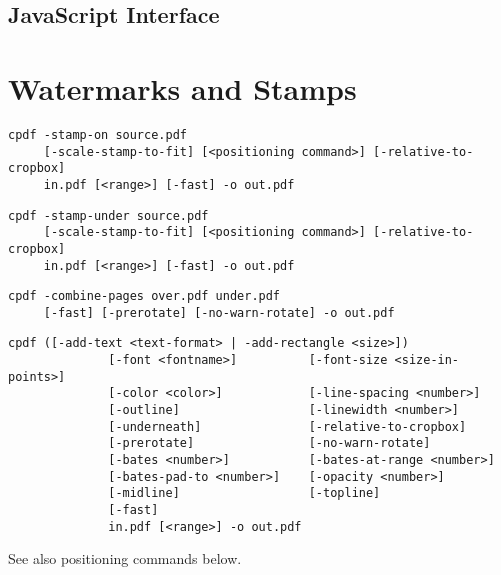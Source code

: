 \documentclass{book}
\begin{document}
\begin{jscpdflib}
\clearpage
\section*{JavaScript Interface}
\begin{small}\tt

\end{small}
\end{jscpdflib}

\chapter{Watermarks and Stamps}\label{chap:8}
\label{stamps}
  \begin{framed}
  \noindent\small\verb!cpdf -stamp-on source.pdf!\\
  \noindent\small\verb!     [-scale-stamp-to-fit] [<positioning command>] [-relative-to-cropbox] !\\
  \noindent\small\verb!     in.pdf [<range>] [-fast] -o out.pdf!
  
  \vspace{1.5mm}
  \noindent\small\verb!cpdf -stamp-under source.pdf!\\
  \noindent\small\verb!     [-scale-stamp-to-fit] [<positioning command>] [-relative-to-cropbox]!\\
  \noindent\small\verb!     in.pdf [<range>] [-fast] -o out.pdf!

  \vspace{1.5mm}
  \noindent\small\verb!cpdf -combine-pages over.pdf under.pdf!\\
  \noindent\small\verb!     [-fast] [-prerotate] [-no-warn-rotate] -o out.pdf!

  \vspace{1.5mm}
  \noindent\small\begin{verbatim}cpdf ([-add-text <text-format> | -add-rectangle <size>])
              [-font <fontname>]          [-font-size <size-in-points>]
              [-color <color>]            [-line-spacing <number>]
              [-outline]                  [-linewidth <number>]
              [-underneath]               [-relative-to-cropbox]
              [-prerotate]                [-no-warn-rotate]
              [-bates <number>]           [-bates-at-range <number>]
              [-bates-pad-to <number>]    [-opacity <number>]
              [-midline]                  [-topline]
              [-fast]
              in.pdf [<range>] -o out.pdf\end{verbatim}
  \noindent See also positioning commands below.


\end{framed}
\end{document}
